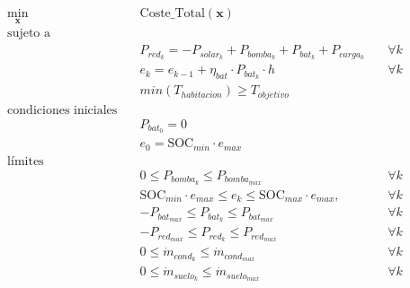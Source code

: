 \begin{align}
	\min_{\mathbf{x}} \quad & \text{Coste\_Total}(\mathbf{x})                                                                                                        \\
	\text{sujeto a} \quad   &                                                                                                                                        \\
	                        & P_{red_k} = -P_{solar_k} + P_{bomba_k} + P_{bat_k} + P_{carga_k} \quad                                                     & \forall k \\
	                        & e_k = e_{k-1} + \eta_{bat} \cdot P_{bat_k} \cdot h \quad                                                                   & \forall k \\
	                        & min(T_{habitacion}) \geq T_{objetivo}                                               \label{eq:min_t_habitacion_constraint}             \\
	\text{condiciones iniciales} \quad                                                                                                                               \\
	                        & P_{bat_0} = 0                                                                                                                          \\
	                        & e_0 = \text{SOC}_{min} \cdot e_{max}                                                                                                   \\
	\text{límites} \quad    &                                                                                                                                        \\
	                        & 0 \leq P_{bomba_k} \leq P_{bomba_{max}} \quad                                                                              & \forall k \\
	                        & \text{SOC}_{min} \cdot e_{max} \leq e_k \leq \text{SOC}_{max} \cdot e_{max}, \quad                                         & \forall k \\
	                        & -P_{bat_{max}} \leq P_{bat_k} \leq P_{bat_{max}} \quad                                                                     & \forall k \\
	                        & -P_{red_{max}} \leq P_{red_k} \leq P_{red_{max}} \quad                                                                     & \forall k \\
	                        & 0 \leq \dot{m}_{cond_k} \leq \dot{m}_{cond_{max}} \quad                                                                    & \forall k \\
	                        & 0 \leq \dot{m}_{suelo_k} \leq \dot{m}_{suelo_{max}} \quad                                                                  & \forall k \\
\end{align}


